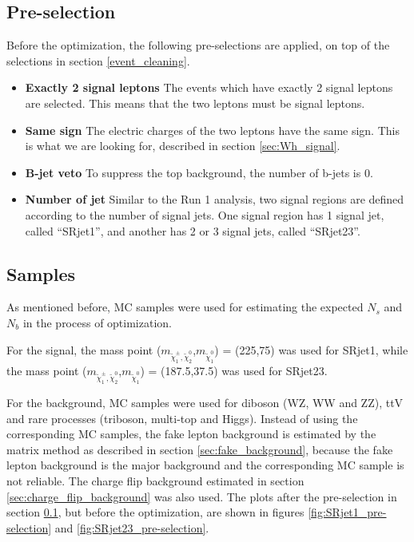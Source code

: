 \subsection{Pre-selection}
\label{sec:SR_pre-selection}
Before the optimization, the following pre-selections are applied, on top of the selections in section \ref{event_cleaning}.
\begin{itemize}
\item \textbf{Exactly 2 signal leptons} The events which have exactly 2 signal leptons are selected. This means that the two leptons must be signal leptons.
\item \textbf{Same sign} The electric charges of the two leptons have the same sign. This is what we are looking for, described in section \ref{sec:Wh_signal}.
\item \textbf{B-jet veto} To suppress the top background, the number of b-jets is 0.
\item \textbf{Number of jet} Similar to the Run 1 analysis, two signal regions are defined according to the number of signal jets. One signal region has 1 signal jet, called ``SRjet1'', and another has 2 or 3 signal jets, called ``SRjet23''.
\end{itemize}

\subsection{Samples}
As mentioned before, MC samples were used for estimating the expected $N_s$ and $N_b$ in the process of optimization.

For the signal, the mass point ($m_{\tilde{\chi}_1^\pm , \tilde{\chi}_2^0}$,$m_{\tilde{\chi}_1^0}$) = (225,75) was used for SRjet1, while the mass point ($m_{\tilde{\chi}_1^\pm , \tilde{\chi}_2^0}$,$m_{\tilde{\chi}_1^0}$) = (187.5,37.5) was used for SRjet23.

For the background, MC samples were used for diboson (WZ, WW and ZZ), ttV and rare processes (triboson, multi-top and Higgs).
Instead of using the corresponding MC samples, the fake lepton background is estimated by the matrix method as described in section \ref{sec:fake_background}, because the fake lepton background is the major background and the corresponding MC sample is not reliable.
The charge flip background estimated in section \ref{sec:charge_flip_background} was also used.
The plots after the pre-selection in section \ref{sec:SR_pre-selection}, but before the optimization, are shown in figures \ref{fig:SRjet1_pre-selection} and \ref{fig:SRjet23_pre-selection}.

